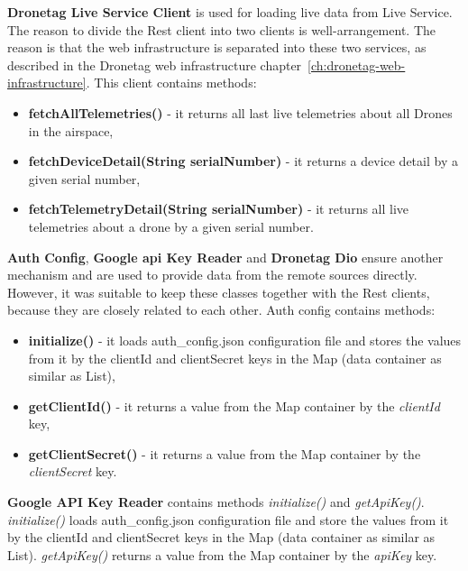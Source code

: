 \textbf{Dronetag Live Service Client} is used for loading live data from Live Service.
The reason to divide the Rest client into two clients is well-arrangement.
The reason is that the web infrastructure is separated into these two services, as described in the Dronetag web infrastructure chapter~\ref{ch:dronetag-web-infrastructure}.
This client contains methods:
\begin{itemize}
    \item \textbf{fetchAllTelemetries()} - it returns all last live telemetries about all Drones in the airspace,
    \item \textbf{fetchDeviceDetail(String serialNumber)} - it returns a device detail by a given serial number,
    \item \textbf{fetchTelemetryDetail(String serialNumber)} - it returns all live telemetries about a drone by a given serial number.
\end{itemize}

\textbf{Auth Config}, \textbf{Google \acrshort{api} Key Reader} and \textbf{Dronetag Dio} ensure another mechanism and are used to provide data from the remote sources directly.
However, it was suitable to keep these classes together with the Rest clients, because they are closely related to each other.
Auth config contains methods:
\begin{itemize}
    \item \textbf{initialize()} - it loads auth\_config.json configuration file and stores the values from it by the clientId and clientSecret keys in the Map (data container as similar as List),
    \item \textbf{getClientId()} - it returns a value from the Map container by the \textit{clientId} key,
    \item \textbf{getClientSecret()} - it returns a value from the Map container by the \textit{clientSecret} key.
\end{itemize}
\textbf{Google API Key Reader} contains methods \textit{initialize()} and \textit{getApiKey()}.
\textit{initialize()} loads auth\_config.json configuration file and store the values from it by the clientId and clientSecret keys in the Map (data container as similar as List).
\textit{getApiKey()} returns a value from the Map container by the \textit{apiKey} key.
